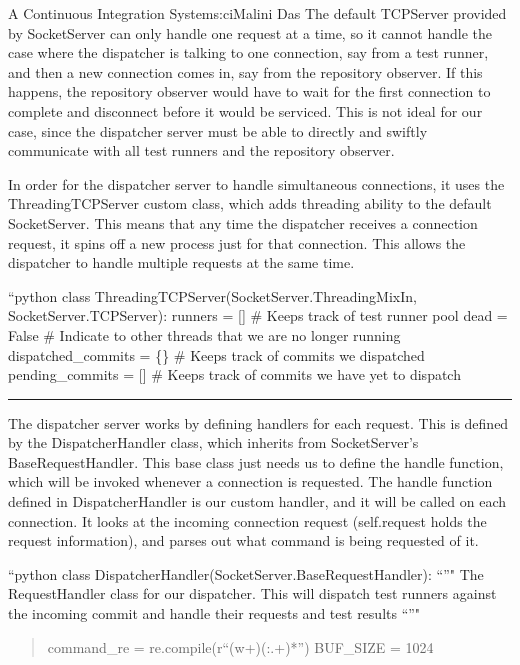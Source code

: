 \begin{aosachapter}{A Continuous Integration System}{s:ci}{Malini Das}
The default TCPServer provided by SocketServer can only handle one
request at a time, so it cannot handle the case where the dispatcher is
talking to one connection, say from a test runner, and then a new
connection comes in, say from the repository observer. If this happens,
the repository observer would have to wait for the first connection to
complete and disconnect before it would be serviced. This is not ideal
for our case, since the dispatcher server must be able to directly and
swiftly communicate with all test runners and the repository observer.

In order for the dispatcher server to handle simultaneous connections,
it uses the ThreadingTCPServer custom class, which adds threading
ability to the default SocketServer. This means that any time the
dispatcher receives a connection request, it spins off a new process
just for that connection. This allows the dispatcher to handle multiple
requests at the same time.

``python class ThreadingTCPServer(SocketServer.ThreadingMixIn,
SocketServer.TCPServer): runners = {[}{]} \# Keeps track of test runner
pool dead = False \# Indicate to other threads that we are no longer
running dispatched\_commits = \{\} \# Keeps track of commits we
dispatched pending\_commits = {[}{]} \# Keeps track of commits we have
yet to dispatch

\begin{center}\rule{3in}{0.4pt}\end{center}

The dispatcher server works by defining handlers for each request. This
is defined by the DispatcherHandler class, which inherits from
SocketServer's BaseRequestHandler. This base class just needs us to
define the handle function, which will be invoked whenever a connection
is requested. The handle function defined in DispatcherHandler is our
custom handler, and it will be called on each connection. It looks at
the incoming connection request (self.request holds the request
information), and parses out what command is being requested of it.

``python class DispatcherHandler(SocketServer.BaseRequestHandler): ``''"
The RequestHandler class for our dispatcher. This will dispatch test
runners against the incoming commit and handle their requests and test
results ``''"

\begin{quote}
command\_re = re.compile(r``(w+)(:.+)*'') BUF\_SIZE = 1024

\begin{aosadescription}


\end{aosadescription}
\end{quote}
\end{aosachapter}
